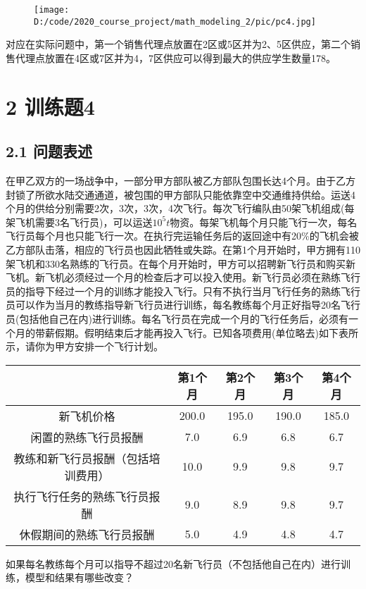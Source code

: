 \documentclass[bachelor,openany,oneside,color]{buaathesis}
\begin{document}
\begin{figure}
\centering
\texttt{[image: D:/code/2020\_course\_project/math\_modeling\_2/pic/pc4.jpg]}
\caption{}
\end{figure}

对应在实际问题中，第一个销售代理点放置在2区或5区并为2、5区供应，第二个销售代理点放置在4区或7区并为4，7区供应可以得到最大的供应学生数量178。

\hypertarget{header-n121}{%
\chapter{2 训练题4}\label{header-n121}}
\setcounter{table}{0}\setcounter{figure}{0}
\hypertarget{header-n122}{%
\section{2.1 问题表述}\label{header-n122}}

在甲乙双方的一场战争中，一部分甲方部队被乙方部队包围长达4个月。由于乙方封锁了所欲水陆交通通道，被包围的甲方部队只能依靠空中交通维持供给。运送4个月的供给分别需要2次，3次，3次，4次飞行。每次飞行编队由50架飞机组成(每架飞机需要3名飞行员)，可以运送\(10^5t\)物资。每架飞机每个月只能飞行一次，每名飞行员每个月也只能飞行一次。在执行完运输任务后的返回途中有20\%的飞机会被乙方部队击落，相应的飞行员也因此牺牲或失踪。在第1个月开始时，甲方拥有110架飞机和330名熟练的飞行员。在每个月开始时，甲方可以招聘新飞行员和购买新飞机。新飞机必须经过一个月的检查后才可以投入使用。新飞行员必须在熟练飞行员的指导下经过一个月的训练才能投入飞行。只有不执行当月飞行任务的熟练飞行员可以作为当月的教练指导新飞行员进行训练，每名教练每个月正好指导20名飞行员(包括他自己在内)进行训练。每名飞行员在完成一个月的飞行任务后，必须有一个月的带薪假期。假明结束后才能再投入飞行。已知各项费用(单位略去)如下表所示，请你为甲方安排一个飞行计划。

\begin{longtable}[]{@{}ccccc@{}}
\toprule
& 第1个月 & 第2个月 & 第3个月 & 第4个月\tabularnewline
\midrule
\endhead
新飞机价格 & 200.0 & 195.0 & 190.0 & 185.0\tabularnewline
闲置的熟练飞行员报酬 & 7.0 & 6.9 & 6.8 & 6.7\tabularnewline
教练和新飞行员报酬（包括培训费用） & 10.0 & 9.9 & 9.8 &
9.7\tabularnewline
执行飞行任务的熟练飞行员报酬 & 9.0 & 8.9 & 9.8 & 9.7\tabularnewline
休假期间的熟练飞行员报酬 & 5.0 & 4.9 & 4.8 & 4.7\tabularnewline
\bottomrule
\end{longtable}

如果每名教练每个月可以指导不超过20名新飞行员（不包括他自己在内）进行训练，模型和结果有哪些改变？
\end{document}
